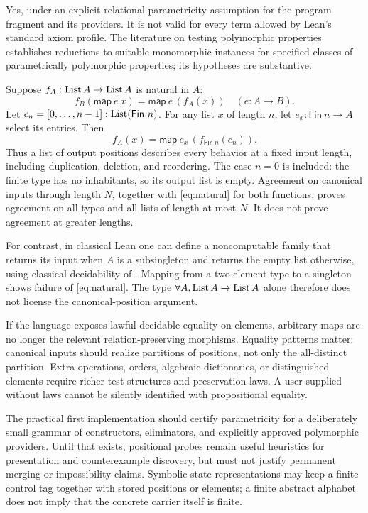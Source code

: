 
\answer Yes, under an explicit relational-parametricity assumption for the program fragment and its providers. It is not valid for every term allowed by Lean's standard axiom profile. The literature on testing polymorphic properties establishes reductions to suitable monomorphic instances for specified classes of parametrically polymorphic properties; its hypotheses are substantive.\cite{polytests}

Suppose $f_A:\operatorname{List} A\to\operatorname{List} A$ is natural in $A$:
\begin{equation}\label{eq:natural}
 f_B(\mathsf{map}\ e\ x)=\mathsf{map}\ e\,(f_A(x))
 \quad(e:A\to B).
\end{equation}
Let $c_n=[0,\ldots,n-1]:\operatorname{List}(\mathsf{Fin}\ n)$. For any list $x$ of length $n$, let $e_x:\mathsf{Fin}\ n\to A$ select its entries. Then
\[
 f_A(x)=\mathsf{map}\ e_x\,(f_{\mathsf{Fin}\ n}(c_n)).
\]
Thus a list of output positions describes every behavior at a fixed input length, including duplication, deletion, and reordering. The case $n=0$ is included: the finite type has no inhabitants, so its output list is empty. Agreement on canonical inputs through length $N$, together with \cref{eq:natural} for both functions, proves agreement on all types and all lists of length at most $N$. It does not prove agreement at greater lengths.

For contrast, in classical Lean one can define a noncomputable family that returns its input when $A$ is a subsingleton and returns the empty list otherwise, using classical decidability of . Mapping from a two-element type to a singleton shows failure of \cref{eq:natural}. The type $\forall A,\operatorname{List} A\to\operatorname{List} A$ alone therefore does not license the canonical-position argument.

If the language exposes lawful decidable equality on elements, arbitrary maps are no longer the relevant relation-preserving morphisms. Equality patterns matter: canonical inputs should realize partitions of positions, not only the all-distinct partition. Extra operations, orders, algebraic dictionaries, or distinguished elements require richer test structures and preservation laws. A user-supplied  without laws cannot be silently identified with propositional equality.

The practical first implementation should certify parametricity for a deliberately small grammar of constructors, eliminators, and explicitly approved polymorphic providers. Until that exists, positional probes remain useful heuristics for presentation and counterexample discovery, but must not justify permanent merging or impossibility claims. Symbolic state representations may keep a finite control tag together with stored positions or elements; a finite abstract alphabet does not imply that the concrete carrier itself is finite.

